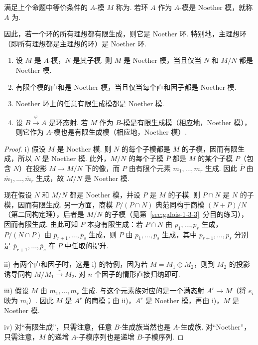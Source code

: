\begin{definition*}
满足上个命题中等价条件的 $A$-模 $M$ 称为. 若环 $A$ 作为 $A$-模是 Noether 模，就称 $A$ 为.
\end{definition*}
因此，若一个环的所有理想都有限生成，则它是 Noether 环. 特别地，主理想环（即所有理想都是主理想的环）是 Noether 环.
\begin{proposition*}
\begin{enumerate}[label=\roman*)]
\item 设 $M$ 是 $A$-模，$N$ 是其子模. 则 $M$ 是 Noether 模，当且仅当 $N$ 和 $M/N$ 都是 Noether 模.
\item 有限个模的直和是 Noether 模，当且仅当每个直和因子都是 Noether 模.
\item Noether 环上的任意有限生成模都是 Noether 模.
\item 设 $B\xrightarrow{\varphi}A$ 是环态射. 若 $M$ 作为 $B$-模是有限生成模（相应地，Noether 模），则它作为 $A$-模也是有限生成模（相应地，Noether 模）.
\end{enumerate}
\end{proposition*}
\begin{proof}
i) 假设 $M$ 是 Noether 模. 则 $N$ 的每个子模都是 $M$ 的子模，因而有限生成，所以 $N$ 是 Noether 模. 此外，$M/N$ 的每个子模 $\overline P$ 都是 $M$ 的某个子模 $P$（包含 $N$）在投影 $M\longrightarrow M/N$ 下的像，而 $P$ 由有限个元素 $m_1,\ldots,m_r$ 生成. 因此 $\overline P$ 由 $\overline m_1,\ldots,\overline m_r$ 生成，故 $M/N$ 是 Noether 模.

现在假设 $N$ 和 $M/N$ 都是 Noether 模，并设 $P$ 是 $M$ 的子模. 则 $P\cap N$ 是 $N$ 的子模，因而有限生成. 另一方面，商模 $P/(P\cap N)$ 典范同构于商模 $(N+P)/N$（第二同构定理），后者是 $M/N$ 的子模（见第~\ref{sec:galois-1-3-3}~分目的练习），因而有限生成. 由此可知 $P$ 本身有限生成：若 $P\cap N$ 由 $p_1,\ldots,p_r$ 生成，$P/(N\cap P)$ 由 $\overline p_{r+1},\ldots,\overline p_s$ 生成，则 $P$ 由 $p_1,\ldots,p_s$ 生成，其中 $p_{r+1},\ldots,p_s$ 分别是 $\overline p_{r+1},\ldots,\overline p_s$ 在 $P$ 中任取的提升.

ii) 有两个直和因子时，这是 i) 的特例，因为若 $M=M_1\oplus M_2$，则到 $M_2$ 的投影诱导同构 $M/M_1\xrightarrow{\sim}M_2$. 对 $n$ 个因子的情形直接归纳即可.

iii) 假设 $M$ 由 $m_1,\ldots,m_r$ 生成. 与这个元素族对应的是一个满态射 $A^r\longrightarrow M$（将 $e_i$ 映为 $m_i$）. 因此 $M$ 是 $A^r$ 的商模；由 ii)，$A^r$ 是 Noether 模，再由 i)，$M$ 是 Noether 模.

iv) 对``有限生成''，只需注意，任意 $B$-生成族当然也是 $A$-生成族. 对``Noether''，只需注意，$M$ 的递增 $A$-子模序列也是递增 $B$-子模序列.
\end{proof}
